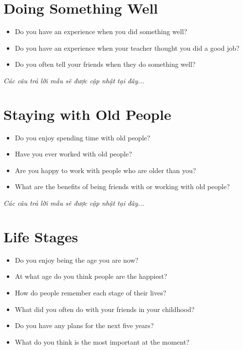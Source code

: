 \section{Doing Something Well}
\begin{ieltsprompt}
\begin{itemize}[itemsep=4pt]
    \item Do you have an experience when you did something well?
    \item Do you have an experience when your teacher thought you did a good job?
    \item Do you often tell your friends when they do something well?
\end{itemize}
\end{ieltsprompt}

\vspace{1em}
\textit{Các câu trả lời mẫu sẽ được cập nhật tại đây...}
\vspace{2em}

\section{Staying with Old People}
\begin{ieltsprompt}
\begin{itemize}[itemsep=4pt]
    \item Do you enjoy spending time with old people?
    \item Have you ever worked with old people?
    \item Are you happy to work with people who are older than you?
    \item What are the benefits of being friends with or working with old people?
\end{itemize}
\end{ieltsprompt}

\vspace{1em}
\textit{Các câu trả lời mẫu sẽ được cập nhật tại đây...}
\vspace{2em}

\section{Life Stages}
\begin{ieltsprompt}
\begin{itemize}[itemsep=4pt]
    \item Do you enjoy being the age you are now?
    \item At what age do you think people are the happiest?
    \item How do people remember each stage of their lives?
    \item What did you often do with your friends in your childhood?
    \item Do you have any plans for the next five years?
    \item What do you think is the most important at the moment?
\end{itemize}
\end{ieltsprompt}

